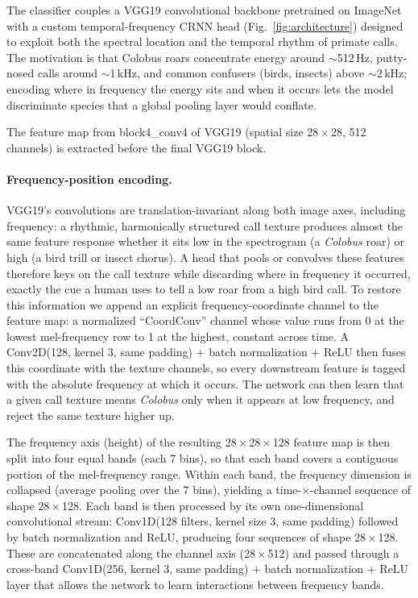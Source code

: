 \documentclass[review,3p,times]{elsarticle}
\begin{document}
The classifier couples a VGG19 convolutional backbone \cite{simonyan2015}
pretrained on ImageNet \cite{deng2009} with a custom temporal-frequency CRNN
head (Fig.~\ref{fig:architecture}) designed to exploit both the spectral
location and the temporal rhythm of primate calls. The motivation is that Colobus roars concentrate energy around
$\sim$512\,Hz, putty-nosed calls around $\sim$1\,kHz, and common confusers
(birds, insects) above $\sim$2\,kHz; encoding where in frequency the
energy sits and when it occurs lets the model discriminate species that
a global pooling layer would conflate.

The feature map from block4\_conv4 of VGG19 (spatial size
28\,$\times$\,28, 512 channels) is extracted before the final VGG19 block.

\paragraph{Frequency-position encoding.}
VGG19's convolutions are translation-invariant along both image axes, including
frequency: a rhythmic, harmonically structured call texture produces almost the
same feature response whether it sits low in the spectrogram (a \textit{Colobus}
roar) or high (a bird trill or insect chorus). A head that pools or convolves
these features therefore keys on the call texture while discarding
where in frequency it occurred, exactly the cue a human uses to tell a
low roar from a high bird call. To restore this information we append an
explicit frequency-coordinate channel to the feature map: a normalized
``CoordConv'' channel \cite{liu2018} whose value runs from 0 at the lowest
mel-frequency row to 1 at the highest, constant across time. A
Conv2D(128, kernel 3, same padding) + batch normalization + ReLU then fuses this
coordinate with the texture channels, so every downstream feature is tagged with
the absolute frequency at which it occurs. The network can then learn that a
given call texture means \textit{Colobus} only when it appears at low frequency,
and reject the same texture higher up.

The frequency axis (height) of the resulting 28\,$\times$\,28\,$\times$\,128
feature map is then split into four equal bands (each 7 bins), so that
each band covers a contiguous portion of the mel-frequency range. Within each
band, the frequency dimension is collapsed (average pooling over the 7 bins),
yielding a time-$\times$-channel sequence of shape 28\,$\times$\,128. Each
band is then processed by its own one-dimensional convolutional stream:
Conv1D(128 filters, kernel size 3, same padding) followed by batch
normalization and ReLU, producing four sequences of shape
28\,$\times$\,128. These are concatenated along the channel axis
(28\,$\times$\,512) and passed through a cross-band Conv1D(256, kernel 3,
same padding) + batch normalization + ReLU layer that allows the network to
learn interactions between frequency bands.
\end{document}
